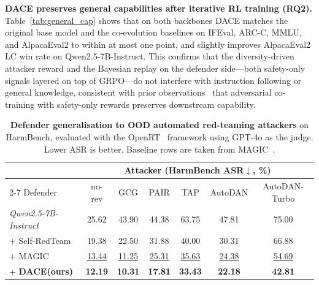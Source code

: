\documentclass{article}
\newcommand{\method}{\textsc{DACE}\xspace}
\begin{document}
\textbf{\method preserves general capabilities after iterative RL training (RQ2).} Table~\ref{tab:general_cap} shows that on both backbones \method matches the original base model and the co-evolution baselines on IFEval, ARC-C, MMLU, and AlpacaEval2 to within at most one point, and slightly improves AlpacaEval2 LC win rate on Qwen2.5-7B-Instruct. This confirms that the diversity-driven attacker reward and the Bayesian replay on the defender side---both safety-only signals layered on top of GRPO---do not interfere with instruction following or general knowledge, consistent with prior observations~\citep{magic2025} that adversarial co-training with safety-only rewards preserves downstream capability.


\begin{table}[t]
\centering
\caption{\textbf{Defender generalisation to OOD automated red-teaming attackers} on HarmBench, evaluated with the OpenRT~\citep{OpenRT2026} framework using GPT-4o as the judge. Lower ASR is better. Baseline rows are taken from MAGIC~\citep{magic2025}.}
\label{tab:harmbench_generalization}
\setlength{\tabcolsep}{3pt}
\renewcommand{\arraystretch}{1.15}
\scriptsize
\begin{tabular}{lcccccc}
\toprule
& \multicolumn{6}{c}{Attacker (HarmBench ASR$\downarrow$, \%)} \\
\cmidrule(lr){2-7}
Defender & no-rev & GCG & PAIR & TAP & AutoDAN & AutoDAN-Turbo \\
\midrule
\textit{Qwen2.5-7B-Instruct}   & 25.62 & 43.90 & 44.38 & 63.75 & 47.81 & 75.00 \\
\quad + Self-RedTeam           & 19.38 & 22.50 & 31.88 & 40.00 & 30.31 & 66.88 \\
\quad + MAGIC                  & \underline{13.44} & \underline{11.25} & \underline{25.31} & \underline{35.63} & \underline{24.38} & \underline{54.69} \\
\cellcolor{cyan!15}\quad + \textbf{\method (ours)} & \cellcolor{cyan!15}\textbf{12.19} & \cellcolor{cyan!15}\textbf{10.31} & \cellcolor{cyan!15}\textbf{17.81 }& \cellcolor{cyan!15}\textbf{33.43} & \cellcolor{cyan!15}\textbf{22.18} & \cellcolor{cyan!15}\textbf{42.81} \\
\bottomrule
\end{tabular}
\end{table}
\end{document}
